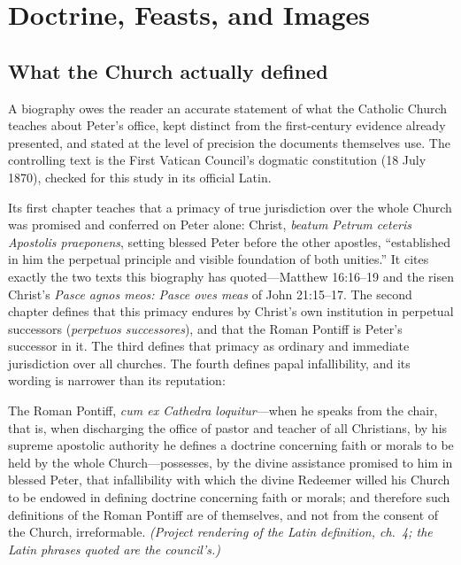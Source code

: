 \section{Doctrine, Feasts, and Images}

\subsection{What the Church actually defined}

A biography owes the reader an accurate statement of what the Catholic
Church teaches about Peter's office, kept distinct from the first-century
evidence already presented, and stated at the level of precision the
documents themselves use. The controlling text is the First Vatican Council's
dogmatic constitution  (18 July 1870), checked for this
study in its official Latin.

Its first chapter teaches that a primacy of true jurisdiction over the whole
Church was promised and conferred on Peter alone: Christ, \textit{beatum
Petrum ceteris Apostolis praeponens}, setting blessed Peter before the other
apostles, ``established in him the perpetual principle and visible foundation
of both unities.'' It cites exactly the two texts this biography has
quoted---Matthew 16:16--19 and the risen Christ's \textit{Pasce agnos meos:
Pasce oves meas} of John 21:15--17. The second chapter defines that this
primacy endures by Christ's own institution in perpetual successors
(\textit{perpetuos successores}), and that the Roman Pontiff is Peter's
successor in it. The third defines that primacy as ordinary and immediate
jurisdiction over all churches. The fourth defines papal infallibility, and
its wording is narrower than its reputation:

\begin{studyframe}\small
The Roman Pontiff, \textit{cum ex Cathedra loquitur}---when he speaks from
the chair, that is, when discharging the office of pastor and teacher of all
Christians, by his supreme apostolic authority he defines a doctrine
concerning faith or morals to be held by the whole Church---possesses, by the
divine assistance promised to him in blessed Peter, that infallibility with
which the divine Redeemer willed his Church to be endowed in defining
doctrine concerning faith or morals; and therefore such definitions of the
Roman Pontiff are of themselves, and not from the consent of the Church,
irreformable. \textit{(Project rendering of the Latin definition,
 ch.~4; the Latin phrases quoted are the council's.)}
\end{studyframe}

